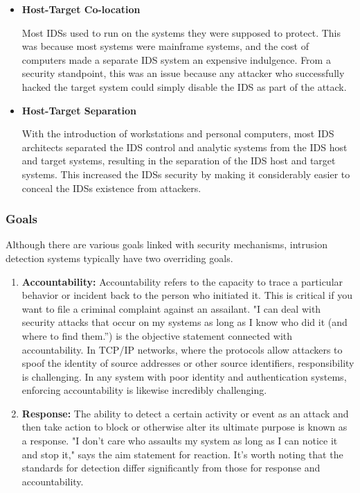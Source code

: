 \documentclass[12pt]{article}
\begin{document}
    \begin{itemize}
     \item \textbf{Host-Target Co-location}
    \par Most IDSs used to run on the systems they were supposed to protect. This was because most systems were mainframe systems, and the cost of computers made a separate IDS system an expensive indulgence. From a security standpoint, this was an issue because any attacker who successfully hacked the target system could simply disable the IDS as part of the attack.
    \\
    
    \item \textbf{Host-Target Separation}
    \par With the introduction of workstations and personal computers, most IDS architects separated the IDS control and analytic systems from the IDS host and target systems, resulting in the separation of the IDS host and target systems. This increased the IDSs security by making it considerably easier to conceal the IDSs existence from attackers.
    \\
    \end{itemize}
    
    \subsubsection{Goals}
    \par Although there are various goals linked with security mechanisms, intrusion detection systems typically have two overriding goals. 
    \\
    
    \begin{enumerate}
        \item \textbf{Accountability: }Accountability refers to the capacity to trace a particular behavior or incident back to the person who initiated it. This is critical if you want to file a criminal complaint against an assailant. "I can deal with security attacks that occur on my systems as long as I know who did it (and where to find them.”) is the objective statement connected with accountability. In TCP/IP networks, where the protocols allow attackers to spoof the identity of source addresses or other source identifiers, responsibility is challenging. In any system with poor identity and authentication systems, enforcing accountability is likewise incredibly challenging.
        
        \item \textbf{Response: }The ability to detect a certain activity or event as an attack and then take action to block or otherwise alter its ultimate purpose is known as a response. "I don't care who assaults my system as long as I can notice it and stop it," says the aim statement for reaction. It's worth noting that the standards for detection differ significantly from those for response and accountability.
 
    \end{enumerate}
    \clearpage
\end{document}
